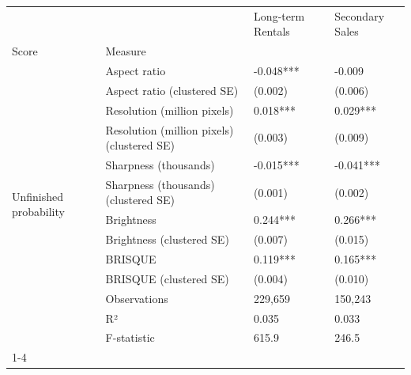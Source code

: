 \begin{tabular}{llll}
\toprule
 &  & Long-term Rentals & Secondary Sales \\
Score & Measure &  &  \\
\midrule
\multirow[t]{13}{*}{Unfinished probability} & Aspect ratio & -0.048*** & -0.009 \\
 & Aspect ratio (clustered SE) & (0.002) & (0.006) \\
 & Resolution (million pixels) & 0.018*** & 0.029*** \\
 & Resolution (million pixels) (clustered SE) & (0.003) & (0.009) \\
 & Sharpness (thousands) & -0.015*** & -0.041*** \\
 & Sharpness (thousands) (clustered SE) & (0.001) & (0.002) \\
 & Brightness & 0.244*** & 0.266*** \\
 & Brightness (clustered SE) & (0.007) & (0.015) \\
 & BRISQUE & 0.119*** & 0.165*** \\
 & BRISQUE (clustered SE) & (0.004) & (0.010) \\
 & Observations & 229,659 & 150,243 \\
 & R² & 0.035 & 0.033 \\
 & F-statistic & 615.9 & 246.5 \\
\cline{1-4}
\bottomrule
\end{tabular}
